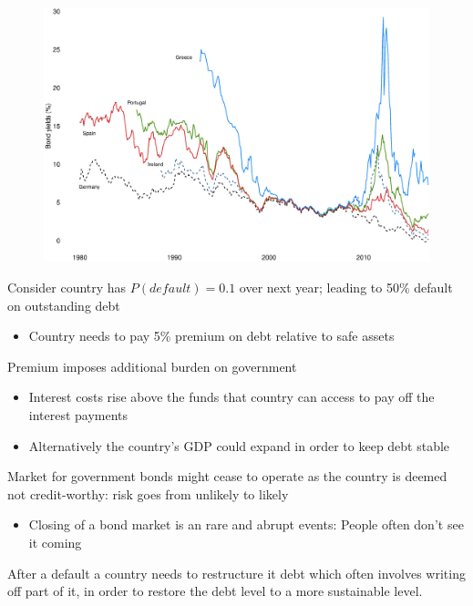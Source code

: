 \documentclass{beamer}
\begin{document}
\begin{frame}
  \begin{figure}
      \includegraphics[scale=.3]{bonds.eps}
    \end{figure}  
\end{frame}

\begin{frame}
  Consider country has $P(default)=0.1$ over next year; leading to 50\% default on outstanding debt
  \begin{itemize}
    \item Country needs to pay 5\% premium on debt relative to safe assets
  \end{itemize}
  \medskip
  Premium imposes additional burden on government
  \begin{itemize}
    \item Interest costs rise above the funds that country can access to pay off the interest payments
    \item Alternatively the country's GDP could expand in order to keep debt stable
  \end{itemize}
  Market for government bonds might cease to operate as the country is deemed not credit-worthy: risk goes from unlikely to likely
  \begin{itemize}
    \item Closing of a bond market is an rare and abrupt events: People often don't see it coming
  \end{itemize}
  After a default a country needs to restructure it debt which often involves writing off part of it, in order to restore the debt level to a more sustainable level. 
\end{frame}
\end{document}
